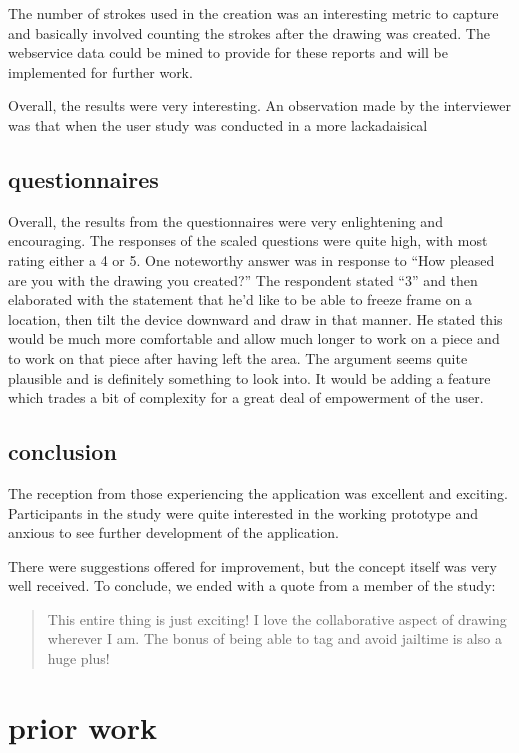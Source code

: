 \documentclass{chi2009}
\begin{document}
The number of strokes used in the creation was an interesting metric to capture
and basically involved counting the strokes after the drawing was created.  The
webservice data could be mined to provide for these reports and will be
implemented for further work.

Overall, the results were very interesting.  An observation made by the
interviewer was that when the user study was conducted in a more lackadaisical

\subsection{questionnaires}

Overall, the results from the questionnaires were very enlightening and
encouraging.   The responses of the scaled questions were quite high, with most
rating either a 4 or 5.  One noteworthy answer was in response to ``How pleased
are you with the drawing you created?'' The respondent stated ``3'' and then
elaborated with the statement that he'd like to be able to freeze frame on a
location, then tilt the device downward and draw in that manner.  He stated
this would be much more comfortable and allow much longer to work on a piece
and to work on that piece after having left the area.  The argument seems quite
plausible and is definitely something to look into.  It would be adding a
feature which trades a bit of complexity for a great deal of empowerment of the
user.

\subsection{conclusion}

The reception from those experiencing the application was excellent and
exciting.   Participants in the study were quite interested in the working
prototype and anxious to see further development of the application.

There were suggestions offered for improvement, but the concept itself was very
well received.  To conclude, we ended with a quote from a member of the study:

\begin{quote}
This entire thing is just exciting!  I love the collaborative aspect of drawing
wherever I am. The bonus of being able to tag and avoid jailtime is also a
huge plus!
\end{quote}

\section{prior work}
\end{document}
